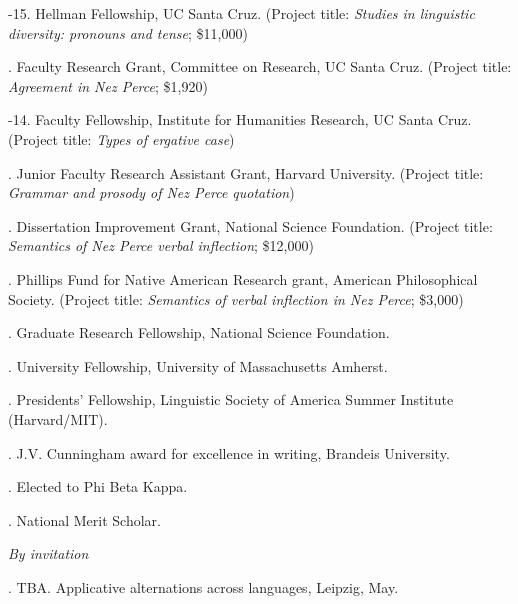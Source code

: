 \documentclass[12pt]{article}
\begin{document}
-15. Hellman Fellowship, UC Santa Cruz. (Project title: \emph{Studies in linguistic diversity: pronouns and tense}; \$11,000)

. Faculty Research Grant, Committee on Research, UC Santa Cruz. (Project title: \emph{Agreement in Nez Perce}; \$1,920)

-14. Faculty Fellowship, Institute for Humanities Research, UC Santa Cruz. (Project title: \emph{Types of ergative case})

. Junior Faculty Research Assistant Grant, Harvard University. (Project title: \emph{Grammar and prosody of Nez Perce quotation}) 

.
Dissertation Improvement Grant, National Science Foundation. (Project title:   \emph{Semantics of Nez Perce verbal inflection}; \$12,000) 

. Phillips Fund for Native American Research grant, American Philosophical Society. (Project title: \emph{Semantics of verbal inflection in Nez Perce}; \$3,000)

.	Graduate Research Fellowship, National Science Foundation.

.	University Fellowship, University of Massachusetts Amherst.

.	Presidents' Fellowship, Linguistic Society of America Summer Institute (Harvard/MIT).

. J.V. Cunningham award for excellence in writing, Brandeis University.

. Elected to Phi Beta Kappa.



.	National Merit Scholar.


\bigskip















\noindent\emph{By invitation \vspace{0.05in}}

. TBA. Applicative alternations across languages, Leipzig, May.
\end{document}
